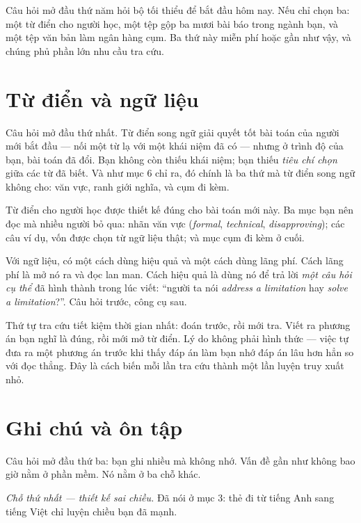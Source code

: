 \documentclass[../../english.tex]{subfiles}
\begin{document}
Câu hỏi mở đầu thứ năm hỏi bộ tối thiểu để bắt đầu hôm nay. Nếu chỉ chọn ba: một từ điển cho người học, một tệp gộp ba mươi bài báo trong ngành bạn, và một tệp văn bản làm ngân hàng cụm. Ba thứ này miễn phí hoặc gần như vậy, và chúng phủ phần lớn nhu cầu tra cứu.

\section{Từ điển và ngữ liệu}

Câu hỏi mở đầu thứ nhất. Từ điển song ngữ giải quyết tốt bài toán của người mới bắt đầu --- nối một từ lạ với một khái niệm đã có --- nhưng ở trình độ của bạn, bài toán đã đổi. Bạn không còn thiếu khái niệm; bạn thiếu \emph{tiêu chí chọn} giữa các từ đã biết. Và như  mục 6 chỉ ra, đó chính là ba thứ mà từ điển song ngữ không cho: văn vực, ranh giới nghĩa, và cụm đi kèm.

Từ điển cho người học được thiết kế đúng cho bài toán mới này. Ba mục bạn nên đọc mà nhiều người bỏ qua: nhãn văn vực (\emph{formal}, \emph{technical}, \emph{disapproving}); các câu ví dụ, vốn được chọn từ ngữ liệu thật; và mục cụm đi kèm ở cuối.

Với ngữ liệu, có một cách dùng hiệu quả và một cách dùng lãng phí. Cách lãng phí là mở nó ra và đọc lan man. Cách hiệu quả là dùng nó để trả lời \emph{một câu hỏi cụ thể} đã hình thành trong lúc viết: ``người ta nói \emph{address a limitation} hay \emph{solve a limitation}?''. Câu hỏi trước, công cụ sau.

\begin{cannho}
Thứ tự tra cứu tiết kiệm thời gian nhất: đoán trước, rồi mới tra. Viết ra phương án bạn nghĩ là đúng, rồi mới mở từ điển. Lý do không phải hình thức --- việc tự đưa ra một phương án trước khi thấy đáp án làm bạn nhớ đáp án lâu hơn hẳn so với đọc thẳng\cite{roediger2006}. Đây là cách biến mỗi lần tra cứu thành một lần luyện truy xuất nhỏ.
\end{cannho}

\section{Ghi chú và ôn tập}

Câu hỏi mở đầu thứ ba: bạn ghi nhiều mà không nhớ. Vấn đề gần như không bao giờ nằm ở phần mềm. Nó nằm ở ba chỗ khác.

\emph{Chỗ thứ nhất --- thiết kế sai chiều.} Đã nói ở  mục 3: thẻ đi từ tiếng Anh sang tiếng Việt chỉ luyện chiều bạn đã mạnh.
\end{document}
